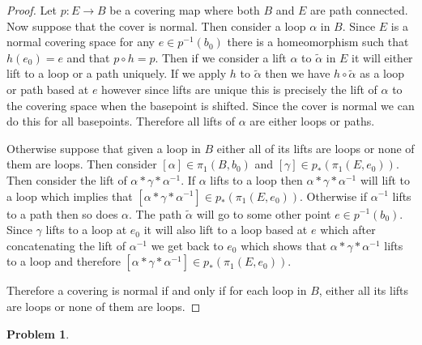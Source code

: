 \documentclass[10pt]{article}
\newcommand{\sk}{\vskip 10mm}
\theoremstyle{plain}
\newtheorem{problem}{Problem}
\theoremstyle{remark}
\begin{document}
\begin{proof}
  Let $p:E\rightarrow B$ be a covering map where both $B$ and $E$ are path connected.
  Now suppose that the cover is normal. Then consider a loop $\alpha$ in $B$.
  Since $E$ is a normal covering space for any $e\in p^{-1}(b_0)$ there
  is a homeomorphism such that $h(e_0)=e$ and that $p\circ h=p$. Then
  if we consider a lift $\alpha$ to $\widetilde{\alpha}$ in $E$ it will either
  lift to a loop or a path uniquely. If we apply $h$ to $\widetilde{\alpha}$
  then we have $h\circ\widetilde{\alpha}$ as a loop or path based at $e$ however
  since lifts are unique this is precisely the lift of $\alpha$ to the
  covering space when the basepoint is shifted. Since the cover is
  normal we can do this for all basepoints. Therefore all lifts
  of $\alpha$ are either loops or paths.

  Otherwise suppose that given a loop in $B$ either all of its lifts
  are loops or none of them are loops. Then consider $[\alpha]\in\pi_1(B,b_0)$ and
  $[\gamma]\in p_*(\pi_1(E,e_0))$. Then consider the lift of $\alpha*\gamma*\alpha^{-1}$. If
  $\alpha$ lifts to a loop then $\alpha*\gamma*\alpha^{-1}$ will lift to a loop which
  implies that $[\alpha*\gamma*\alpha^{-1}]\in p_*(\pi_1(E,e_0))$. Otherwise
  if $\alpha^{-1}$ lifts to a path then so does $\alpha$. The path
  $\widetilde{\alpha}$ will go to some other point $e\in p^{-1}(b_0)$. Since
  $\gamma$ lifts to a loop at $e_0$ it will also lift to a loop based at $e$ which
  after concatenating the lift of $\alpha^{-1}$ we get back to $e_0$ which shows
  that $\alpha*\gamma*\alpha^{-1}$ lifts to a loop and therefore $[\alpha*\gamma*\alpha^{-1}]\in p_*(\pi_1(E,e_0))$.

  Therefore a covering is normal if and only if for each loop in $B$,
  either all its lifts are loops or none of them are loops.
\end{proof}

\sk

\begin{problem} %
  
\end{problem}
\end{document}
